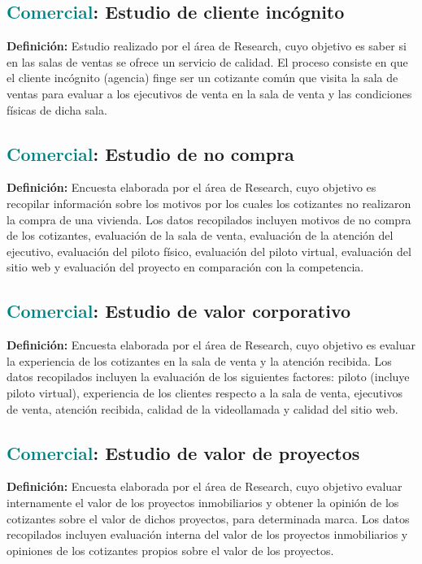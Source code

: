 \documentclass[12pt]{article}
\begin{document}
\subsection{\textcolor{teal}{Comercial}: Estudio de cliente incógnito}
\textbf{Definición:} Estudio realizado por el área de Research, cuyo objetivo es saber si en las salas de ventas se ofrece un servicio de calidad. El proceso consiste en que el cliente incógnito (agencia) finge ser un cotizante común que visita la sala de ventas para evaluar a los ejecutivos de venta en la sala de venta y las condiciones físicas de dicha sala.
\subsection{\textcolor{teal}{Comercial}: Estudio de no compra}
\textbf{Definición:} Encuesta elaborada por el área de Research, cuyo objetivo es recopilar información sobre los motivos por los cuales los cotizantes no realizaron la compra de una vivienda. Los datos recopilados incluyen motivos de no compra de los cotizantes, evaluación de la sala de venta, evaluación de la atención del ejecutivo, evaluación del piloto físico, evaluación del piloto virtual, evaluación del sitio web y evaluación del proyecto en comparación con la competencia.
\subsection{\textcolor{teal}{Comercial}: Estudio de valor corporativo}
\textbf{Definición:} Encuesta elaborada por el área de Research, cuyo objetivo es evaluar la experiencia de los cotizantes en la sala de venta y la atención recibida. Los datos recopilados incluyen la evaluación de los siguientes factores: 
piloto (incluye piloto virtual), experiencia de los clientes respecto a la sala de venta, ejecutivos de venta, atención recibida, calidad de la videollamada y calidad del sitio web.
\subsection{\textcolor{teal}{Comercial}: Estudio de valor de proyectos}
\textbf{Definición:} Encuesta elaborada por el área de Research, cuyo objetivo evaluar internamente el valor de los proyectos inmobiliarios y obtener la opinión de los cotizantes sobre el valor de dichos proyectos, para determinada marca. Los datos recopilados incluyen evaluación interna del valor de los proyectos inmobiliarios y opiniones de los cotizantes propios sobre el valor de los proyectos.
\end{document}
